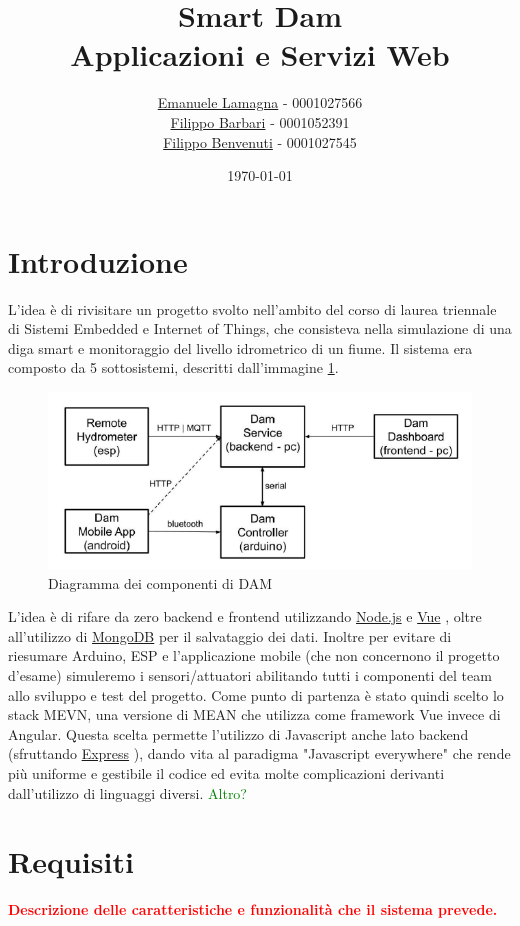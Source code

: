 \documentclass{article}
\title{
    Smart Dam \\
    \large Applicazioni e Servizi Web
}
\author{\href{mailto:emanuele.lamagna@studio.unibo.it}{Emanuele Lamagna} - 0001027566\\\href{mailto:filippo.barbari@studio.unibo.it}{Filippo Barbari} - 0001052391\\\href{mailto:filippo.benvenuti3@studio.unibo.it}{Filippo Benvenuti} - 0001027545}
\date{\today}
\newcommand{\node}{\href{https://nodejs.org/it/}{Node.js} }
\newcommand{\vue}{\href{https://vuejs.org/}{Vue} }
\newcommand{\express}{\href{https://expressjs.com/it/}{Express} }
\newcommand{\mongodb}{\href{https://www.mongodb.com/it-it}{MongoDB} }
\begin{document}
\maketitle
\clearpage
\tableofcontents
\clearpage

\section*{Introduzione}\label{sec:intro}
L'idea è di rivisitare un progetto svolto nell'ambito del corso di laurea triennale di Sistemi Embedded e Internet of Things, che consisteva nella simulazione di una diga smart e monitoraggio del livello idrometrico di un fiume. Il sistema era composto da 5 sottosistemi, descritti dall'immagine \ref{fig:dam-scheme}.
\begin{figure}[h!]
	\centering
	\includegraphics[scale=0.7]{dam-scheme.png}
	\caption{Diagramma dei componenti di DAM}
	\label{fig:dam-scheme}
\end{figure}
L'idea è di rifare da zero backend e frontend utilizzando \node e \vue, oltre all'utilizzo di \mongodb per il salvataggio dei dati. Inoltre per evitare di riesumare Arduino, ESP e l'applicazione mobile (che non concernono il progetto d'esame) simuleremo i sensori/attuatori abilitando tutti i componenti del team allo sviluppo e test del progetto.
Come punto di partenza è stato quindi scelto lo stack MEVN, una versione di MEAN che utilizza come framework Vue invece di Angular. Questa scelta permette l'utilizzo di Javascript anche lato backend (sfruttando \express), dando vita al paradigma "Javascript everywhere" che rende più uniforme e gestibile il codice ed evita molte complicazioni derivanti dall'utilizzo di linguaggi diversi. 
\textcolor{green}{Altro?}
\clearpage

\section{Requisiti}
\textcolor{red}{\textbf{Descrizione delle caratteristiche e funzionalità che il sistema prevede.}} %
\end{document}
